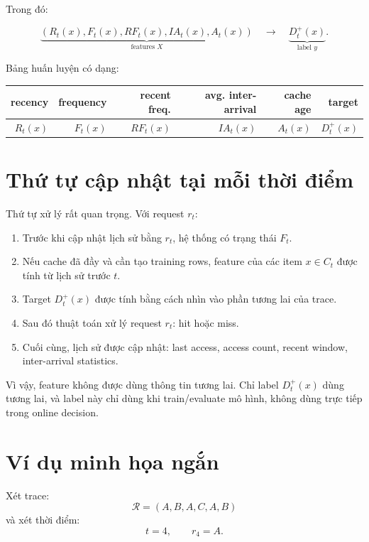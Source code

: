 \documentclass[11pt,a4paper]{article}
\begin{document}
Trong đó:

\[
    \underbrace{
    \left(
    R_t(x),
    F_t(x),
    RF_t(x),
    IA_t(x),
    A_t(x)
    \right)
    }_{\text{features }X}
    \quad
    \longrightarrow
    \quad
    \underbrace{D_t^+(x)}_{\text{label }y}.
\]

Bảng huấn luyện có dạng:

\begin{center}
\begin{tabular}{rrrrrr}
\toprule
recency & frequency & recent freq. & avg. inter-arrival & cache age & target \\
\midrule
\(R_t(x)\) & \(F_t(x)\) & \(RF_t(x)\) & \(IA_t(x)\) & \(A_t(x)\) & \(D_t^+(x)\) \\
\bottomrule
\end{tabular}
\end{center}

\section{Thứ tự cập nhật tại mỗi thời điểm}

Thứ tự xử lý rất quan trọng. Với request \(r_t\):

\begin{enumerate}[leftmargin=1.4em]
    \item Trước khi cập nhật lịch sử bằng \(r_t\), hệ thống có trạng thái \(F_t\).
    \item Nếu cache đã đầy và cần tạo training rows, feature của các item \(x\in C_t\) được tính từ lịch sử trước \(t\).
    \item Target \(D_t^+(x)\) được tính bằng cách nhìn vào phần tương lai của trace.
    \item Sau đó thuật toán xử lý request \(r_t\): hit hoặc miss.
    \item Cuối cùng, lịch sử được cập nhật: last access, access count, recent window, inter-arrival statistics.
\end{enumerate}

Vì vậy, feature không được dùng thông tin tương lai. Chỉ label \(D_t^+(x)\) dùng tương lai, và label này chỉ dùng khi train/evaluate mô hình, không dùng trực tiếp trong online decision.

\section{Ví dụ minh họa ngắn}

Xét trace:
\[
    \mathcal{R}=(A,B,A,C,A,B)
\]
và xét thời điểm:
\[
    t=4,\qquad r_4=A.
\]
\end{document}
